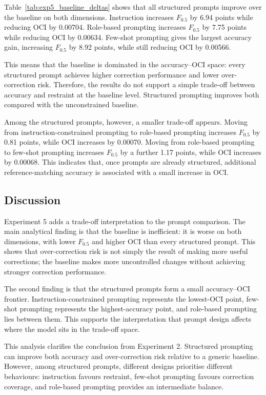 Table~\ref{tab:exp5_baseline_deltas} shows that all structured prompts improve over the baseline on both dimensions. Instruction increases $F_{0.5}$ by 6.94 points while reducing OCI by 0.00704. Role-based prompting increases $F_{0.5}$ by 7.75 points while reducing OCI by 0.00634. Few-shot prompting gives the largest accuracy gain, increasing $F_{0.5}$ by 8.92 points, while still reducing OCI by 0.00566.

This means that the baseline is dominated in the accuracy--OCI space: every structured prompt achieves higher correction performance and lower over-correction risk. Therefore, the results do not support a simple trade-off between accuracy and restraint at the baseline level. Structured prompting improves both compared with the unconstrained baseline.

Among the structured prompts, however, a smaller trade-off appears. Moving from instruction-constrained prompting to role-based prompting increases $F_{0.5}$ by 0.81 points, while OCI increases by 0.00070. Moving from role-based prompting to few-shot prompting increases $F_{0.5}$ by a further 1.17 points, while OCI increases by 0.00068. This indicates that, once prompts are already structured, additional reference-matching accuracy is associated with a small increase in OCI.

\subsection{Discussion}

Experiment 5 adds a trade-off interpretation to the prompt comparison. The main analytical finding is that the baseline is inefficient: it is worse on both dimensions, with lower $F_{0.5}$ and higher OCI than every structured prompt. This shows that over-correction risk is not simply the result of making more useful corrections; the baseline makes more uncontrolled changes without achieving stronger correction performance.

The second finding is that the structured prompts form a small accuracy--OCI frontier. Instruction-constrained prompting represents the lowest-OCI point, few-shot prompting represents the highest-accuracy point, and role-based prompting lies between them. This supports the interpretation that prompt design affects where the model sits in the trade-off space.

This analysis clarifies the conclusion from Experiment 2. Structured prompting can improve both accuracy and over-correction risk relative to a generic baseline. However, among structured prompts, different designs prioritise different behaviours: instruction favours restraint, few-shot prompting favours correction coverage, and role-based prompting provides an intermediate balance.

